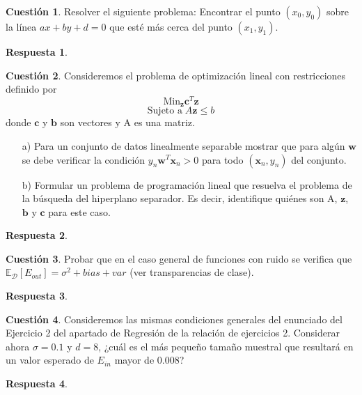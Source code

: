 \documentclass[10pt,a4paper]{article}
\theoremstyle{definition}
\newtheorem{cuestion}{Cuestión}
\newtheorem*{respuesta}{Respuesta}
\begin{document}
\begin{cuestion}
Resolver el siguiente problema: Encontrar el punto $(x_0,y_0)$ sobre la línea $ax+by+d=0$ que esté más cerca del punto $(x_1,y_1)$.
\end{cuestion}
\begin{respuesta}
\end{respuesta}

\begin{cuestion}
Consideremos el problema de optimización lineal con restricciones definido por 
\[	\textrm{Min}_{\mathbf{z}}\mathbf{c}^T\mathbf{z}	\]
\[	\textrm{Sujeto a}\; A\mathbf{z} \leq b	\]
donde $\mathbf{c}$ y $\mathbf{b}$ son vectores y A es una matriz.
\begin{enumerate}
\item[a)] Para un conjunto de datos linealmente separable mostrar que para algún $\mathbf{w}$ se debe verificar la condición $y_n\mathbf{w}^T\mathbf{x}_n > 0$ para todo $(\mathbf{x}_n, y_n)$ del conjunto.
\item[b)] Formular un problema de programación lineal que resuelva el problema de la búsqueda del hiperplano separador. Es decir, identifique quiénes son A, $\mathbf{z}$, $\mathbf{b}$ y $\mathbf{c}$ para este caso.
\end{enumerate}
\end{cuestion}
\begin{respuesta}
\end{respuesta}

\begin{cuestion}
Probar que en el caso general de funciones con ruido se verifica que $\mathbb{E}_{\mathcal{D}}[E_{out}]=\sigma^2+bias+var$ (ver transparencias de clase).
\end{cuestion}
\begin{respuesta}
\end{respuesta}

\begin{cuestion}
Consideremos las mismas condiciones generales del enunciado del Ejercicio 2 del apartado de Regresión de la relación de ejercicios 2. Considerar ahora $\sigma=0.1$ y $d=8$, ¿cuál es el más pequeño tamaño muestral que resultará en un valor esperado de $E_{in}$ mayor de 0.008?
\end{cuestion}
\begin{respuesta}
\end{respuesta}
\end{document}
